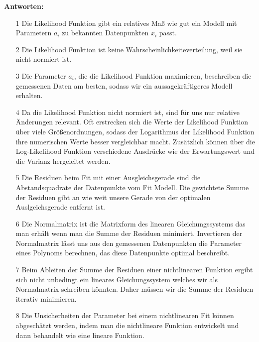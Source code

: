 \begin{tcolorbox}[enhanced,width=6in,
    fontupper=\small,drop fuzzy shadow southwest,
    colframe=black!50!black,colback=black!5]
\textbf{Antworten:} \\
\begin{enumerate}
\item[1] Die Likelihood Funktion gibt ein relatives Maß wie gut ein Modell mit Parametern $a_i$ zu bekannten Datenpunkten $x_i$ passt.
\item[2] Die Likelihood Funktion ist keine Wahrscheinlichkeiteverteilung, weil sie nicht normiert ist. 
\item[3] Die Parameter $a_i$, die die Likelihood Funktion maximieren, beschreiben die gemessenen Daten am besten, sodass wir ein aussagekräftigeres Modell erhalten. 
\item[4] Da die Likelihood Funktion nicht normiert ist, sind für uns nur relative Änderungen relevant. Oft erstrecken sich die Werte der Likelihood Funktion über viele Größenordnungen, sodass der Logarithmus der Likelihood Funktion ihre numerischen Werte besser vergleichbar macht. Zusätzlich können über die Log-Likelihood Funktion verschiedene Ausdrücke wie der Erwartungswert und die Varianz hergeleitet werden. 
\item[5] Die Residuen beim Fit mit einer Ausgleichsgerade sind die Abstandsquadrate der Datenpunkte vom Fit Modell. Die gewichtete Summe der Residuen gibt an wie weit unsere Gerade von der optimalen Auslgeichsgerade entfernt ist.  
\item[6] Die Normalmatrix ist die Matrixform des linearen Gleichungssystems das man erhält wenn man die Summe der Residuen minimiert. Invertieren der Normalmatrix lässt uns aus den gemessenen Datenpunkten die Parameter eines Polynoms berechnen, das diese Datenpunkte optimal beschreibt. 
\item[7] Beim Ableiten der Summe der Residuen einer nichtlinearen Funktion ergibt sich nicht unbedingt ein lineares Gleichungssystem welches wir als Normalmatrix schreiben könnten. Daher müssen wir die Summe der Residuen iterativ minimieren.  
\item[8] Die Unsicherheiten der Parameter bei einem nichtlinearen Fit können abgeschätzt werden, indem man die nichtlineare Funktion entwickelt und dann behandelt wie eine lineare Funktion. 
\end{enumerate}
\end{tcolorbox}
